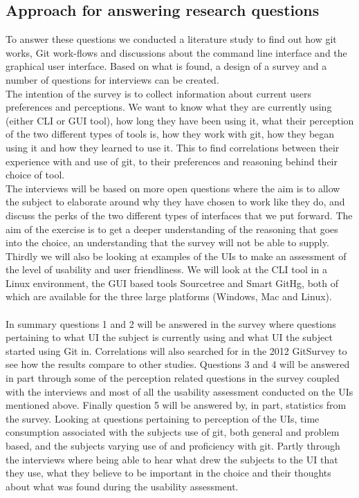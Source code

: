 \documentclass[12pt,a4paper,article,compsoc]{IEEEtran}
\begin{document}
			\subsection{Approach for answering research questions}
			To answer these questions we conducted a literature study to find out how git works, Git work-flows and discussions about the command line interface and the graphical user interface. Based on what is found, a design of a survey and a number of  questions for interviews can be created.\\
			The intention of the survey is to collect information about current users preferences and perceptions. We want to know what they are currently using (either CLI or GUI tool), how long they have been using it, what their perception of the two different types of tools is, how they work with git, how they began using it and how they learned to use it. This to find correlations between their experience with and use of git, to their preferences and reasoning behind their choice of tool.\\
			The interviews will be based on more open questions where the aim is to allow the subject to elaborate around why they have chosen to work like they do, and discuss the perks of the two different types of interfaces that we put forward. The aim of the exercise is to get a deeper understanding of the reasoning that goes into the choice, an understanding that the survey will not be able to supply.\\
			Thirdly we will also be looking at examples of the UIs to make an assessment of the level of usability and user friendliness. We will look at the CLI tool in a Linux environment, the GUI based tools Sourcetree and Smart GitHg, both of which are available for the three large platforms (Windows, Mac and Linux). %
			\\\\
			In summary questions 1 and 2 will be answered in the survey where questions pertaining to what UI the subject is currently using and what UI the subject started using Git in. Correlations will also searched for in the 2012 GitSurvey \cite{GitUserSurvey} to see how the results compare to other studies. Questions 3 and 4 will be answered in part through some of the perception related questions in the survey coupled with the interviews and most of all the usability assessment conducted on the UIs mentioned above. Finally question 5 will be answered by, in part, statistics from the survey. Looking at questions pertaining to perception of the UIs, time consumption associated with the subjects use of git, both general and problem based, and the subjects varying use of and proficiency with git. Partly through the interviews where being able to hear what drew the subjects to the UI that they use, what they believe to be important in the choice and their thoughts about what was found during the usability assessment.
		 
\end{document}
